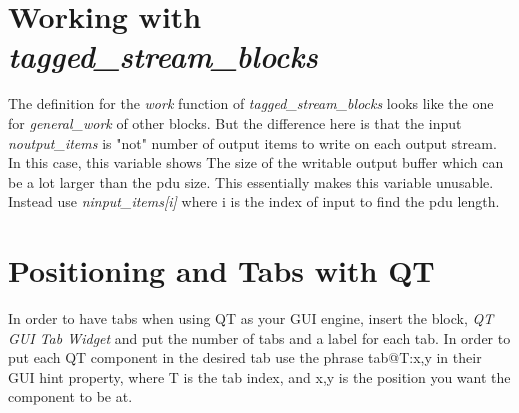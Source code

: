 \section{Working with \textit{tagged\_stream\_blocks}}

The definition for the \textit{work} function of \textit{tagged\_stream\_blocks} looks like the one for \textit{general\_work} of other blocks. But the difference here is that the input \textit{noutput\_items} is "not" number of output items to write on each output stream. In this case, this variable shows The size of the writable output buffer which can be a lot larger than the pdu size. This essentially makes this variable unusable. Instead use \textit{ninput\_items[i]} where i is the index of input to find the pdu length.



\section{Positioning and Tabs with QT}

In order to have tabs when using QT as your GUI engine, insert the block, \textit{QT GUI Tab Widget} and put the number of tabs and a label for each tab. In order to put each QT component in the desired tab use the phrase tab@T:x,y in their GUI hint property, where T is the tab index, and x,y is the position you want the component to be at.

